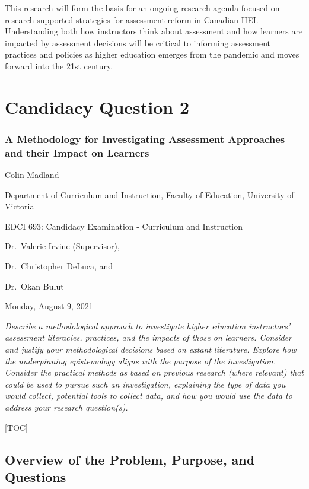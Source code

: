 \documentclass[
]{book}
\begin{document}
This research will form the basis for an ongoing research agenda focused on research-supported strategies for assessment reform in Canadian HEI. Understanding both how instructors think about assessment and how learners are impacted by assessment decisions will be critical to informing assessment practices and policies as higher education emerges from the pandemic and moves forward into the 21st century.

\hypertarget{candidacy-question-2}{%
\chapter{Candidacy Question 2}\label{candidacy-question-2}}

\hypertarget{a-methodology-for-investigating-assessment-approaches-and-their-impact-on-learners}{%
\subsection{A Methodology for Investigating Assessment Approaches and their Impact on Learners}\label{a-methodology-for-investigating-assessment-approaches-and-their-impact-on-learners}}

Colin Madland

Department of Curriculum and Instruction, Faculty of Education, University of Victoria

EDCI 693: Candidacy Examination - Curriculum and Instruction

Dr.~Valerie Irvine (Supervisor),

Dr.~Christopher DeLuca, and

Dr.~Okan Bulut

Monday, August 9, 2021

\emph{Describe a methodological approach to investigate higher education instructors' assessment literacies, practices, and the impacts of those on learners. Consider and justify your methodological decisions based on extant literature. Explore how the underpinning epistemology aligns with the purpose of the investigation. Consider the practical methods as based on previous research (where relevant) that could be used to pursue such an investigation, explaining the type of data you would collect, potential tools to collect data, and how you would use the data to address your research question(s).}

{[}TOC{]}

\hypertarget{overview-of-the-problem-purpose-and-questions}{%
\section{Overview of the Problem, Purpose, and Questions}\label{overview-of-the-problem-purpose-and-questions}}
\end{document}
